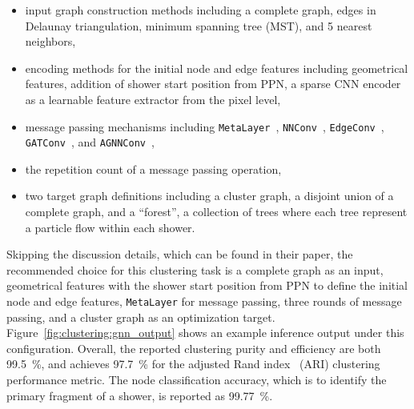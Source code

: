 \documentclass{ws-rv9x6}
\begin{document}
\begin{itemize}
    \item input graph construction methods including a complete graph, edges in Delaunay triangulation, minimum spanning tree (MST), and 5 nearest neighbors,
    \item encoding methods for the initial node and edge features including geometrical features, addition of shower start position from PPN, a sparse CNN encoder as a learnable feature extractor from the pixel level,
    \item message passing mechanisms including \verb|MetaLayer|~\cite{inductive_bias}, \verb|NNConv|~\cite{nnconv}, \verb|EdgeConv|~\cite{edgeconv}, \verb|GATConv|~\cite{gatconv}, and \verb|AGNNConv|~\cite{agnnconv},
    \item the repetition count of a message passing operation,
    \item two target graph definitions including a cluster graph, a disjoint union of a complete graph, and a ``forest'', a collection of trees where each tree represent a particle flow within each shower.
\end{itemize}
Skipping the discussion details, which can be found in their paper, the recommended choice for this clustering task is a complete graph as an input, geometrical features with the shower start position from PPN to define the initial node and edge features, \verb|MetaLayer| for message passing, three rounds of message passing, and a cluster graph as an optimization target. Figure~\ref{fig:clustering:gnn_output} shows an example inference output under this configuration. Overall, the reported clustering purity and efficiency are both 99.5~\%, and achieves 97.7~\% for the adjusted Rand index~\cite{ari} (ARI) clustering performance metric. The node classification accuracy, which is to identify the primary fragment of a shower, is reported as 99.77~\%.
\end{document}
